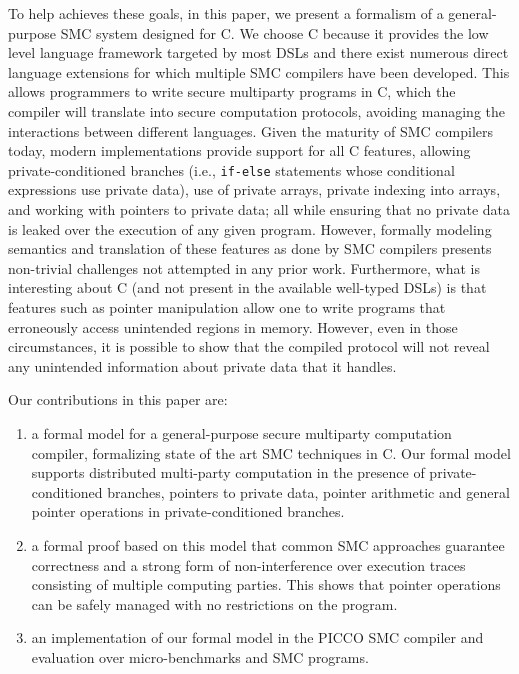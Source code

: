 To help achieves these goals, in this paper, we present a formalism of a general-purpose SMC system designed for C. We choose C because it provides the low level language framework targeted by most DSLs and there exist numerous direct language extensions for which multiple SMC compilers have been developed. This allows programmers to write secure multiparty programs in C, which the compiler will translate into secure computation protocols, avoiding managing the interactions between different languages. Given the maturity of SMC compilers today, modern implementations provide support for all C features, allowing private-conditioned branches (i.e., \texttt{if-else} statements whose conditional expressions use private data), use of private arrays, private indexing into arrays, and working with pointers to private data; all while ensuring that no private data is leaked over the execution of any given program. However, formally modeling semantics and translation of these features as done by SMC compilers presents non-trivial challenges not attempted in any prior work. Furthermore, what is interesting about C (and not present in the available well-typed DSLs) is that features such as pointer manipulation allow one to write programs that erroneously access unintended regions in memory. However, even in those circumstances, it is possible to show that the compiled protocol will not reveal any unintended information about private data that it handles.


Our contributions in this paper are:
\begin{enumerate}%
\item a formal model for a general-purpose secure multiparty
  computation compiler, formalizing state of the art SMC techniques in 
  C. Our formal model supports distributed multi-party computation in the
  presence of private-conditioned branches, pointers to private data, 
  pointer arithmetic and general pointer operations in  private-conditioned branches. 
\item a formal proof based on this model that common SMC approaches
  guarantee correctness and a strong form of non-interference over execution
  traces consisting of multiple computing parties.  This shows that pointer
  operations can be safely managed with no restrictions on the program. 
 \item an implementation of our formal model in the PICCO SMC compiler and evaluation over micro-benchmarks and SMC programs.
\end{enumerate}

